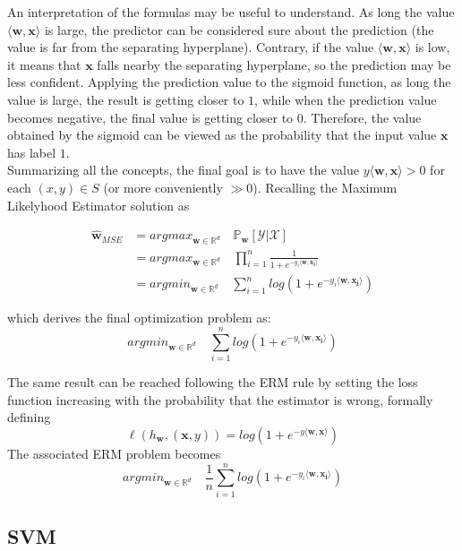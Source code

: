 An interpretation of the formulas may be useful to understand. As long the value $\langle \mathbf{w}, \mathbf{x} \rangle$ is large, the predictor can be considered sure about the prediction (the value is far from the separating hyperplane). Contrary, if the value $\langle \mathbf{w}, \mathbf{x} \rangle$ is low, it means that $\mathbf{x}$ falls nearby the separating hyperplane, so the prediction may be less confident. Applying the prediction value to the sigmoid function, as long the value is large, the result is getting closer to $1$, while when the prediction value becomes negative, the final value is getting closer to $0$.
Therefore, the value obtained by the sigmoid can be viewed as the probability that the input value $\mathbf{x}$ has label $1$.\\
Summarizing all the concepts, the final goal is to have the value $y \langle \mathbf{w}, \mathbf{x} \rangle > 0$ for each $(x, y) \in S$ (or more conveniently $\gg 0$). Recalling the Maximum Likelyhood Estimator solution as

\begin{align*}
 \hat{\mathbf{w}}_{MSE} &= argmax_{\mathbf{w} \in \mathbb{R}^d} \quad \mathbb{P}_\mathbf{w}[\mathcal{Y} | \mathcal{X}]	\\
 						&= argmax_{\mathbf{w} \in \mathbb{R}^d} \quad \prod_{i=1}^{n} \frac{1}{1 + e^{-y_i \langle \mathbf{w}, \mathbf{x_i} \rangle}}	\\
 						&= argmin_{\mathbf{w} \in \mathbb{R}^d} \quad \sum_{i=1}^{n} log(1 + e^{-y_i \langle \mathbf{w}, \mathbf{x_i} \rangle})
\end{align*}

which derives the final optimization problem as:
\[ argmin_{\mathbf{w} \in \mathbb{R}^d} \quad \sum_{i=1}^{n} log(1 + e^{-y_i \langle \mathbf{w}, \mathbf{x_i} \rangle}) \]

The same result can be reached following the ERM rule by setting the loss function increasing with the probability that the estimator is wrong, formally defining
\[ \ell (h_\mathbf{w}, (\mathbf{x}, y)) = log(1 + e^{-y \langle \mathbf{w}, \mathbf{x} \rangle}) \]
The associated ERM problem becomes
\[ argmin_{\mathbf{w} \in \mathbb{R}^d} \quad \frac{1}{n} \sum_{i=1}^{n} log(1 + e^{-y_i \langle \mathbf{w}, \mathbf{x_i} \rangle}) \]



\subsection{SVM}

